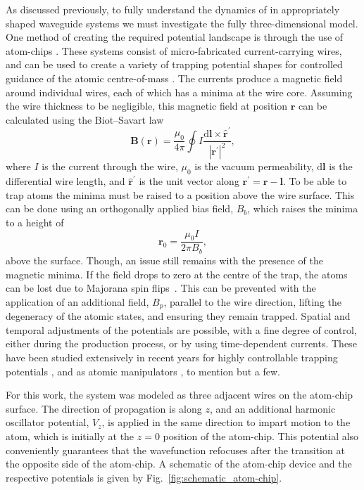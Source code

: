 As discussed previously, to fully understand the dynamics of in appropriately shaped waveguide systems we must investigate the fully three-dimensional model. One method of creating the required potential landscape is through the use of atom-chips \cite{AO:Bartenstein_ieee_2000,AO:Folman_prl_2000}. These systems consist of micro-fabricated current-carrying wires, and can be used to create a variety of trapping potential shapes for controlled guidance of the atomic centre-of-mass \cite{AO:Denschlag_prl_1999}. The currents produce a magnetic field around individual wires, each of which has a minima at the wire core. Assuming the wire thickness to be negligible, this magnetic field at position $\mathbf{r}$ can be calculated using the Biot--Savart law
\begin{equation}
    \mathbf{B}(\mathbf{r}) = \frac{\mu_0}{4\pi}\oint I \frac{\text{d}\mathbf{l}\times \hat{\mathbf{r}}^{'}}{|\mathbf{r^{'}}|^2},
\end{equation}
where $I$ is the current through the wire, $\mu_0$ is the vacuum permeability, $\text{d}\mathbf{l}$ is the differential wire length, and $\hat{\mathbf{r}}^{'}$ is the unit vector along $\mathbf{r^{'}} = \mathbf{r} - \mathbf{l}$. To be able to trap atoms the minima must be raised to a position above the wire surface. This can be done using an orthogonally applied bias field, ${B}_b$, which raises the minima to a height of
\begin{equation}
    \mathbf{r}_0 = \frac{\mu_0 I}{2\pi {B}_b},
\end{equation}
above the surface. Though, an issue still remains with the presence of the magnetic minima. If the field drops to zero at the centre of the trap, the atoms can be lost due to Majorana spin flips~\cite{AO:Brink_pra_2006}. This can be prevented with the application of an additional field, ${B}_{p}$, parallel to the wire direction, lifting the degeneracy of the atomic states, and ensuring they remain trapped. Spatial and temporal adjustments of the potentials are possible, with a fine degree of control, either during the production process, or by using time-dependent currents. These have been studied extensively in recent years for highly controllable trapping potentials \cite{AO:Yun_optexp_2006,AO:Gallego_optlett_2009}, and as atomic manipulators \cite{AO:Bensky_qip_2011}, to mention but a few.

For this work, the system was modeled as three adjacent wires on the atom-chip surface. The direction of propagation is along $z$, and an additional harmonic oscillator potential, $V_z$, is applied in the same direction to impart motion to the atom, which is initially at the $z=0$ position of the atom-chip. This potential also conveniently guarantees that the wavefunction refocuses after the transition at the opposite side of the atom-chip. A schematic of the atom-chip device and the respective potentials is given by Fig.~\ref{fig:schematic_atom-chip}.

